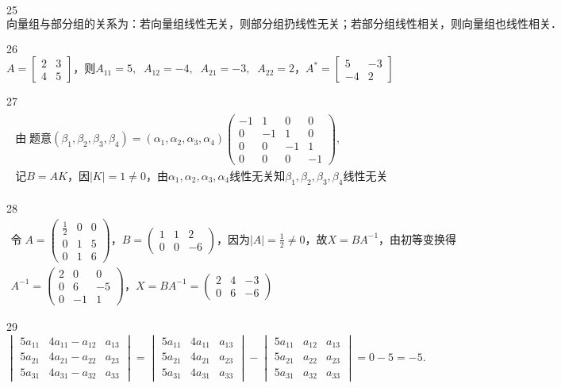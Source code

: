 25
$\mathrm{向量组与部分组的关系为}：\mathrm{若向量组线性无关}，\mathrm{则部分组扔线性无关}；\mathrm{若部分组线性相关}，\mathrm{则向量组也线性相关}．$


26
$A=\begin{bmatrix}2&3\\4&5\end{bmatrix}，则A_{11}=5,\;\;A_{12}=-4,\;\;A_{21}=-3,\;\;A_{22}=2，A^\ast=\begin{bmatrix}5&-3\\-4&2\end{bmatrix}$


27
$\begin{array}{l}\begin{array}{l}由\;\mathrm{题意}(\beta_1,\beta_2,\beta_3,\beta_4)=(\alpha_1,\alpha_2,\alpha_3,\alpha_4)\begin{pmatrix}-1&1&0&0\\0&-1&1&0\\0&0&-1&1\\0&0&0&-1\end{pmatrix},\\记B=AK，因\vert K\vert=1\neq0，由\alpha_1,\alpha_2,\alpha_3,\alpha_4\mathrm{线性无关知}\beta_1,\beta_2,\beta_3,\beta_4\mathrm{线性无关}\end{array}\end{array}$


28
$\begin{array}{l}令\;A=\begin{pmatrix}\frac12&0&0\\0&1&5\\0&1&6\end{pmatrix}，B=\begin{pmatrix}1&1&2\\0&0&-6\end{pmatrix}，\mathrm{因为}\left|A\right|=\frac12\neq0，故X=BA^{-1}，\mathrm{由初等变换得}\\A^{-1}=\begin{pmatrix}2&0&0\\0&6&-5\\0&-1&1\end{pmatrix}，X=BA^{-1}=\begin{pmatrix}2&4&-3\\0&6&-6\end{pmatrix}\end{array}$


29
$\begin{vmatrix}5a_{11}&4a_{11}-a_{12}&a_{13}\\5a_{21}&4a_{21}-a_{22}&a_{23}\\5a_{31}&4a_{31}-a_{32}&a_{33}\end{vmatrix}=\begin{vmatrix}5a_{11}&4a_{11}&a_{13}\\5a_{21}&4a_{21}&a_{23}\\5a_{31}&4a_{31}&a_{33}\end{vmatrix}-\begin{vmatrix}5a_{11}&a_{12}&a_{13}\\5a_{21}&a_{22}&a_{23}\\5a_{31}&a_{32}&a_{33}\end{vmatrix}=0-5=-5.$


